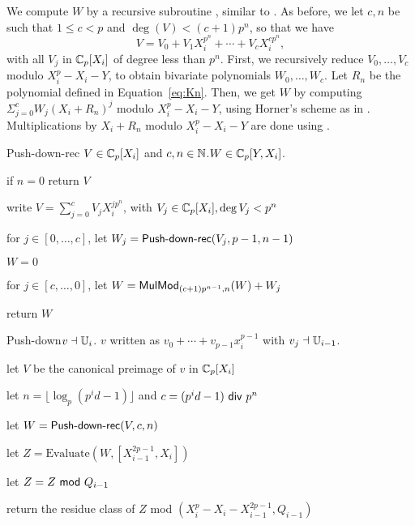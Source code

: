 \smallskip 

We compute $W$ by a recursive subroutine , similar
to . As before, we let $c,n$ be such that $1\le c<p$ and
$\deg(V) < (c+1)p^n$, so that we have
$$V=V_0+ V_1X_i^{p^n}+\cdots+V_c X_i^{cp^n},$$ with all $V_j$ in
$\mathbb{C}_p[X_i]$ of degree less than $p^n$. First, we recursively reduce
$V_0,\dots,V_c$ modulo $X_i^p-X_i-Y$, to obtain bivariate
polynomials $W_0,\dots,W_{c}$. Let $R_n$ be the polynomial defined in
Equation~\eqref{eq:Kn}. Then, we get $W$ by computing
$\Sigma_{j=0}^c W_j(X_i+R_n)^j$ modulo $X_i^p-X_i-Y$,
using Horner's scheme as in . Multiplications by
$X_i+R_n$ modulo $X_i^p-X_i-Y$ are done using .

\begin{algorithm}
  {Push-down-rec} {$V\in \mathbb{C}_p[X_i]$ and $c,n\in\mathbb{N}$.}{$W \in\mathbb{C}_p[Y,X_i]$.}
\item if $n=0$ return $V$
\item write $V=\sum_{j=0}^{c} V_j X_i^{jp^n}$, with $V_j \in \mathbb{C}_p[X_i], \deg V_j<p^n$
\item for $j\in [0,\dots,c]$, let $W_j=\text{{\sf Push-down-rec}}(V_j,p-1,n-1)$
\item $W=0$
\item\label{pd:loop} for $j\in [c,\dots,0]$, let $W = {\sf MulMod}_{(c+1)p^{n-1},n}(W) + W_j$
\item return $W$
\end{algorithm}
\begin{algorithm}
  {Push-down}{$v\dashv \mathbb{U}_i$.}{ $v$ written as $v_0+\cdots+v_{p-1}x_i^{p-1}$ with $v_j \dashv \mathbb{U}_{i-1}$.}
\item let $V$ be the canonical preimage of $v$ in $\mathbb{C}_p[X_i]$
\item let $n=\lfloor \log_p(p^id-1) \rfloor$ and $c=(p^id-1){\sf~div~} p^n$
\item let $W = \text{{\sf Push-down-rec}}(V,c,n)$
\item let $Z = \text{Evaluate}(W,[X_{i-1}^{2p-1},X_i])$
\item \label{step:pd:mod} let $Z = Z {\sf~mod~} Q_{i-1}$
\item \label{step:pd:return} return the residue class of $Z$ mod $(X_i^p - X_i - X_{i-1}^{2p-1},Q_{i-1})$
\end{algorithm}

